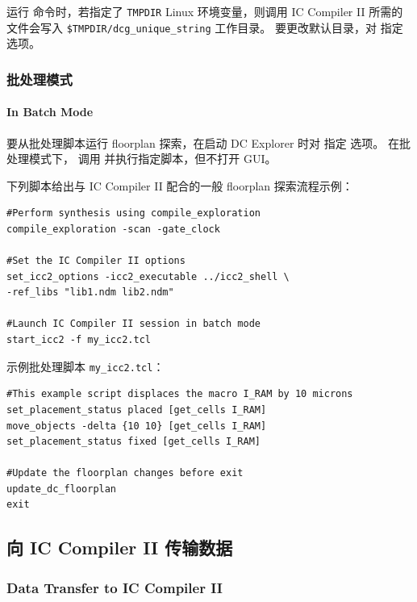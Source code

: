 \begin{noteBox}
运行  命令时，若指定了 \texttt{TMPDIR} Linux 环境变量，则调用 IC Compiler II 所需的文件会写入 \texttt{\$TMPDIR/dcg\_unique\_string} 工作目录。
要更改默认目录，对  指定  选项。
\end{noteBox}

\subsubsection{批处理模式}
\paragraph*{In Batch Mode}

要从批处理脚本运行 floorplan 探索，在启动 DC Explorer 时对  指定  选项。
在批处理模式下， 调用  并执行指定脚本，但不打开 GUI。

下列脚本给出与 IC Compiler II 配合的一般 floorplan 探索流程示例：
\begin{lstlisting}
#Perform synthesis using compile_exploration
compile_exploration -scan -gate_clock

#Set the IC Compiler II options
set_icc2_options -icc2_executable ../icc2_shell \
-ref_libs "lib1.ndm lib2.ndm"

#Launch IC Compiler II session in batch mode
start_icc2 -f my_icc2.tcl
\end{lstlisting}

示例批处理脚本 \texttt{my\_icc2.tcl}：
\begin{lstlisting}
#This example script displaces the macro I_RAM by 10 microns
set_placement_status placed [get_cells I_RAM]
move_objects -delta {10 10} [get_cells I_RAM]
set_placement_status fixed [get_cells I_RAM]

#Update the floorplan changes before exit
update_dc_floorplan
exit
\end{lstlisting}

\subsection{向 IC Compiler II 传输数据}
\subsubsection*{Data Transfer to IC Compiler II}

